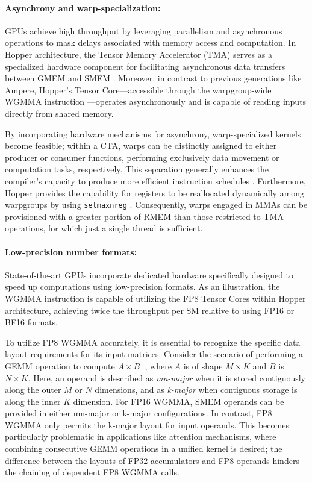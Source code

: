 \begin{enumerate}
\paragraph{Asynchrony and warp-specialization:}

GPUs achieve high throughput by leveraging parallelism and asynchronous operations to mask delays associated with memory access and computation. In Hopper architecture, the Tensor Memory Accelerator (TMA) serves as a specialized hardware component for facilitating asynchronous data transfers between GMEM and SMEM \cite[\S7.29]{cuda}. Moreover, in contrast to previous generations like Ampere, Hopper's Tensor Core—accessible through the warpgroup-wide WGMMA instruction \cite[\S9.7.14]{ptx}—operates asynchronously and is capable of reading inputs directly from shared memory.

By incorporating hardware mechanisms for asynchrony, warp-specialized kernels become feasible; within a CTA, warps can be distinctly assigned to either producer or consumer functions, performing exclusively data movement or computation tasks, respectively. This separation generally enhances the compiler’s capacity to produce more efficient instruction schedules \citep{warp-specialization-2011}. Furthermore, Hopper provides the capability for registers to be reallocated dynamically among warpgroups by using \verb|setmaxnreg| \cite[\S9.7.17.1]{ptx}. Consequently, warps engaged in MMAs can be provisioned with a greater portion of RMEM than those restricted to TMA operations, for which just a single thread is sufficient.

\paragraph{Low-precision number formats:}
\label{sec:low-precision-gpu}
State-of-the-art GPUs incorporate dedicated hardware specifically designed to speed up computations using low-precision formats. As an illustration, the WGMMA instruction is capable of utilizing the FP8 Tensor Cores within Hopper architecture, achieving twice the throughput per SM relative to using FP16 or BF16 formats.

To utilize FP8 WGMMA accurately, it is essential to recognize the specific data layout requirements for its input matrices. Consider the scenario of performing a GEMM operation to compute $A \times B^{\top}$, where $A$ is of shape $M\times K$ and $B$ is $N\times K$. Here, an operand is described as \emph{mn-major} when it is stored contiguously along the outer $M$ or $N$ dimensions, and as \emph{k-major} when contiguous storage is along the inner $K$ dimension. For FP16 WGMMA, SMEM operands can be provided in either mn-major or k-major configurations. In contrast, FP8 WGMMA only permits the k-major layout for input operands. This becomes particularly problematic in applications like attention mechanisms, where combining consecutive GEMM operations in a unified kernel is desired; the difference between the layouts of FP32 accumulators and FP8 operands hinders the chaining of dependent FP8 WGMMA calls.


\end{enumerate}
